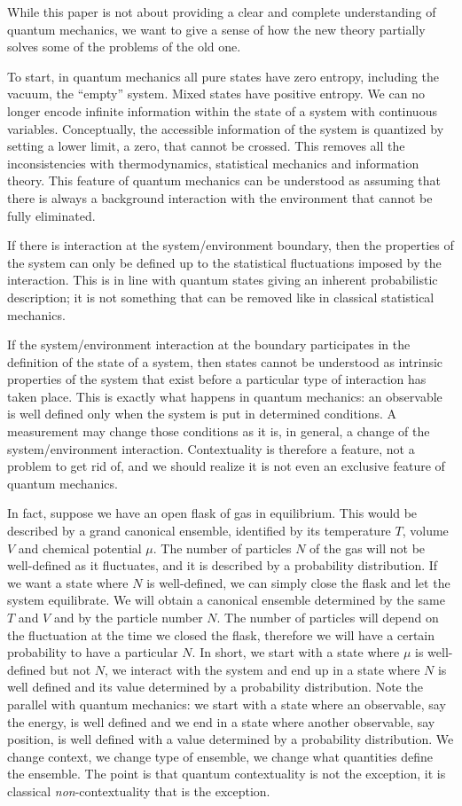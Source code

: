 \documentclass[10pt,twocolumn, nofootinbib]{revtex4-2}
\begin{document}
While this paper is not about providing a clear and complete understanding of quantum mechanics, we want to give a sense of how the new theory partially solves some of the problems of the old one.

To start, in quantum mechanics all pure states have zero entropy, including the vacuum, the ``empty'' system. Mixed states have positive entropy. We can no longer encode infinite information within the state of a system with continuous variables. Conceptually, the accessible information of the system is quantized by setting a lower limit, a zero, that cannot be crossed. This removes all the inconsistencies with thermodynamics, statistical mechanics and information theory. This feature of quantum mechanics can be understood as assuming that there is always a background interaction with the environment that cannot be fully eliminated.

If there is interaction at the system/environment boundary, then the properties of the system can only be defined up to the statistical fluctuations imposed by the interaction. This is in line with quantum states giving an inherent probabilistic description; it is not something that can be removed like in classical statistical mechanics.

If the system/environment interaction at the boundary participates in the definition of the state of a system, then states cannot be understood as intrinsic properties of the system that exist before a particular type of interaction has taken place. This is exactly what happens in quantum mechanics: an observable is well defined only when the system is put in determined conditions. A measurement may change those conditions as it is, in general, a change of the system/environment interaction. Contextuality is therefore a feature, not a problem to get rid of, and we should realize it is not even an exclusive feature of quantum mechanics.

In fact, suppose we have an open flask of gas in equilibrium. This would be described by a grand canonical ensemble, identified by its temperature $T$, volume $V$ and chemical potential $\mu$. The number of particles $N$ of the gas will not be well-defined as it fluctuates, and it is described by a probability distribution. If we want a state where $N$ is well-defined, we can simply close the flask and let the system equilibrate. We will obtain a canonical ensemble determined by the same $T$ and $V$ and by the particle number $N$. The number of particles will depend on the fluctuation at the time we closed the flask, therefore we will have a certain probability to have a particular $N$. In short, we start with a state where $\mu$ is well-defined but not $N$, we interact with the system and end up in a state where $N$ is well defined and its value determined by a probability distribution. Note the parallel with quantum mechanics: we start with a state where an observable, say the energy, is well defined and we end in a state where another observable, say position, is well defined with a value determined by a probability distribution. We change context, we change type of ensemble, we change what quantities define the ensemble. The point is that quantum contextuality is not the exception, it is classical \emph{non}-contextuality that is the exception.
\end{document}
